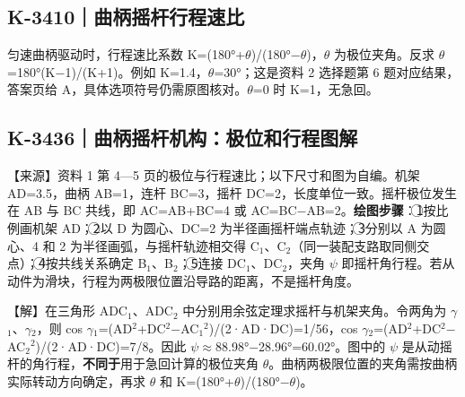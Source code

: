 \documentclass[zihao=5,a4paper,UTF8,fontset=fandol]{ctexart}
\begin{document}
\subsection{K-3410｜曲柄摇杆行程速比}
\label{k-3410}

匀速曲柄驱动时，行程速比系数 K=(180°+$\theta$)/(180°$-$$\theta$)，$\theta$ 为极位夹角。反求 $\theta$=180°(K$-$1)/(K+1)。例如 K=1.4，$\theta$=30°；这是资料 2 选择题第 6 题对应结果，答案页给 A，具体选项符号仍需原图核对。$\theta$=0 时 K=1，无急回。





\subsection{K-3436｜曲柄摇杆机构：极位和行程图解}
\label{k-3436}

【来源】资料 1 第 4—5 页的极位与行程速比；以下尺寸和图为自编。机架 AD=3.5，曲柄 AB=1，连杆 BC=3，摇杆 DC=2，长度单位一致。摇杆极位发生在 AB 与 BC 共线，即 AC=AB+BC=4 或 AC=BC$-$AB=2。\textbf{绘图步骤}：\textcircled{1}按比例画机架 AD；\textcircled{2}以 D 为圆心、DC=2 为半径画摇杆端点轨迹；\textcircled{3}分别以 A 为圆心、4 和 2 为半径画弧，与摇杆轨迹相交得 C$_{1}$、C$_{2}$（同一装配支路取同侧交点）；\textcircled{4}按共线关系确定 B$_{1}$、B$_{2}$；\textcircled{5}连接 DC$_{1}$、DC$_{2}$，夹角 $\psi$ 即摇杆角行程。若从动件为滑块，行程为两极限位置沿导路的距离，不是摇杆角度。


\begin{center}
\end{center}


【解】在三角形 ADC$_{1}$、ADC$_{2}$ 中分别用余弦定理求摇杆与机架夹角。令两角为 $\gamma$$_{1}$、$\gamma$$_{2}$，则 cos $\gamma$$_{1}$=(AD$^{2}$+DC$^{2}$$-$AC$_{1}$$^{2}$)/(2·AD·DC)=1/56，cos $\gamma$$_{2}$=(AD$^{2}$+DC$^{2}$$-$AC$_{2}$$^{2}$)/(2·AD·DC)=7/8。因此 $\psi$$\approx$88.98°$-$28.96°=60.02°。图中的 $\psi$ 是从动摇杆的角行程，\textbf{不同于}用于急回计算的极位夹角 $\theta$。曲柄两极限位置的夹角需按曲柄实际转动方向确定，再求 $\theta$ 和 K=(180°+$\theta$)/(180°$-$$\theta$)。
\end{document}
